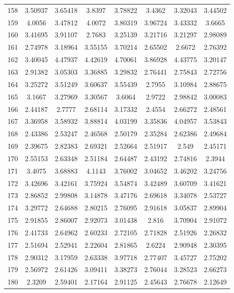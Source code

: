 \begin{center}
\begin{longtable}{cccccccc}
158 & 3.50937 & 3.65418 & 3.8397 & 3.78822 & 3.4362 & 3.32043 & 3.44502\\
159 & 4.0056 & 3.47812 & 4.0072 & 3.80319 & 3.96724 & 3.43332 & 3.6665\\
160 & 3.41695 & 3.91107 & 2.7683 & 3.25139 & 3.21716 & 3.21297 & 2.98089\\
161 & 2.74978 & 3.18964 & 3.55155 & 3.70214 & 2.65502 & 2.6672 & 2.76392\\
162 & 3.40045 & 4.47937 & 4.42619 & 4.70061 & 3.86928 & 4.43775 & 3.20147\\
163 & 2.91382 & 3.05303 & 3.36885 & 3.29832 & 2.76441 & 2.75843 & 2.72756\\
164 & 3.25272 & 3.51249 & 3.60637 & 3.55439 & 2.7955 & 3.10984 & 2.88675\\
165 & 3.1667 & 3.27969 & 3.30567 & 3.6064 & 2.9722 & 2.98842 & 3.00083\\
166 & 2.44187 & 2.7777 & 2.68114 & 3.17332 & 2.4554 & 2.66272 & 2.48561\\
167 & 3.36958 & 3.58932 & 3.88814 & 4.03199 & 3.35836 & 4.04957 & 3.53843\\
168 & 2.43386 & 2.53247 & 2.46568 & 2.50179 & 2.35284 & 2.62386 & 2.49684\\
169 & 2.39675 & 2.82383 & 2.69321 & 2.52664 & 2.51917 & 2.549 & 2.45171\\
170 & 2.55153 & 2.63348 & 2.51184 & 2.64487 & 2.43192 & 2.74816 & 2.3944\\
171 & 3.4075 & 3.68883 & 4.1143 & 3.76002 & 3.04652 & 3.46202 & 3.24756\\
172 & 3.42696 & 3.42161 & 3.75924 & 3.54874 & 3.42489 & 3.60709 & 3.41621\\
173 & 2.86852 & 2.99808 & 3.14878 & 3.47176 & 2.69618 & 3.34078 & 2.53727\\
174 & 3.29772 & 2.64688 & 2.80215 & 2.76095 & 2.91618 & 3.05837 & 2.89904\\
175 & 2.91855 & 2.86007 & 2.92073 & 3.01438 & 2.816 & 3.70904 & 2.91072\\
176 & 2.41733 & 2.64962 & 2.60233 & 2.72105 & 2.71828 & 2.51926 & 2.26832\\
177 & 2.51694 & 2.52941 & 2.22604 & 2.81865 & 2.6224 & 2.90948 & 2.30395\\
178 & 2.90312 & 3.17959 & 2.63338 & 3.97718 & 2.77407 & 3.45727 & 2.75202\\
179 & 2.56972 & 2.61426 & 3.09411 & 3.38273 & 2.76044 & 3.28523 & 2.66273\\
180 & 2.3209 & 2.59401 & 2.17164 & 2.91125 & 2.45643 & 2.76678 & 2.12649\\

\end{longtable}
\end{center}
